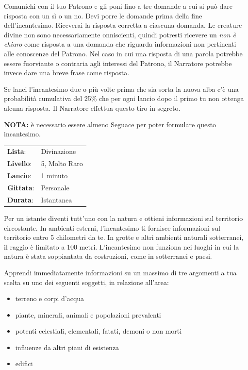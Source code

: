 \begin{multicols}{2}
Comunichi con il tuo Patrono e gli poni fino a tre domande a cui si può dare risposta con un sì o un no. Devi porre le domande prima della fine dell'incantesimo. Riceverai la risposta corretta a ciascuna domanda. Le creature divine non sono necessariamente onniscienti, quindi potresti ricevere un \emph{non è chiaro} come risposta a una domanda che riguarda informazioni non pertinenti alle conoscenze del Patrono. Nel caso in cui una risposta di una parola potrebbe essere fuorviante o contraria agli interessi del Patrono, il Narratore potrebbe invece dare una breve frase come risposta.

Se lanci l'incantesimo due o più volte prima che sia sorta la nuova alba c'è una probabilità cumulativa del 25\% che per ogni lancio dopo il primo tu non ottenga alcuna risposta. Il Narratore effettua questo tiro in segreto.

\textbf{NOTA:} è necessario essere almeno Seguace per poter formulare questo incantesimo.

\noindent\begin{tabularx}{\linewidth}{p{1.3cm}X}
	\rowcolor{gray!20}\textbf{Lista}: & Divinazione \\
	\textbf{Livello}: & 5, Molto Raro \\
	\rowcolor{gray!20}\textbf{Lancio}: & 1 minuto \\
	\textbf{Gittata}: & Personale \\
	\rowcolor{gray!20}\textbf{Durata}: & Istantanea \\
\end{tabularx}\smallskip

Per un istante diventi tutt'uno con la natura e ottieni informazioni sul territorio circostante. In ambienti esterni, l'incantesimo ti fornisce informazioni sul territorio entro 5 chilometri da te. In grotte e altri ambienti naturali sotterranei, il raggio è limitato a 100 metri. L'incantesimo non funziona nei luoghi in cui la natura è stata soppiantata da costruzioni, come in sotterranei e paesi.

Apprendi immediatamente informazioni su un massimo di tre argomenti a tua scelta su uno dei seguenti soggetti, in relazione all'area:

\begin{itemize}\setlength{\itemsep}{-1pt}
	\item terreno e corpi d'acqua
	\item piante, minerali, animali e popolazioni prevalenti
	\item potenti celestiali, elementali, fatati, demoni o non morti
	\item influenze da altri piani di esistenza
	\item edifici
\end{itemize}


\end{multicols}
